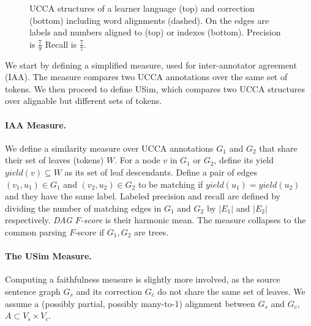 \documentclass[a4paper, 11pt]{article}
\begin{document}
\begin{figure}[t]
				\caption{\label{fig:example}
					UCCA structures of a learner language (top) and correction (bottom) including word alignments (dashed). On the edges are labels and numbers aligned to (top) or indexes (bottom). Precision is $\frac{7}{9}$ Recall is $\frac{7}{7}$.
				}

			\end{figure}
We start by defining a simplified measure, used for inter-annotator agreement (IAA).
The measure compares two UCCA annotations over the 
same set of tokens. We then proceed to define {\sc USim}, which compares two UCCA structures
over alignable but different sets of tokens.


\paragraph{IAA Measure.} We define a similarity measure over UCCA annotations 
$G_1$ and $G_2$ that share their set of leaves (tokens) $W$.
For a node $v$ in $G_1$ or $G_2$, define its yield $yield(v) \subseteq W$ as its
set of leaf descendants.
Define a pair of edges $(v_1,u_1) \in G_1$ and $(v_2,u_2) \in G_2$ to be matching
if $yield(u_1) = yield(u_2)$ and they have the same label.
Labeled precision and recall are defined by dividing the number of matching edges
in $G_1$ and $G_2$ by $|E_1|$ and $|E_2|$ respectively.
{\it DAG $F$-score} is their harmonic mean.
The measure collapses to the common parsing $F$-score if $G_1, G_2$ are trees.


\paragraph{The {\sc USim} Measure.} Computing a faithfulness
measure is slightly more involved, as the source sentence graph $G_s$ and its
correction $G_c$ do not share the same set of leaves.
%
%
We assume a (possibly partial, possibly many-to-1) alignment between $G_s$ and $G_c$,
$A \subset V_s \times V_c$. 
\end{document}
